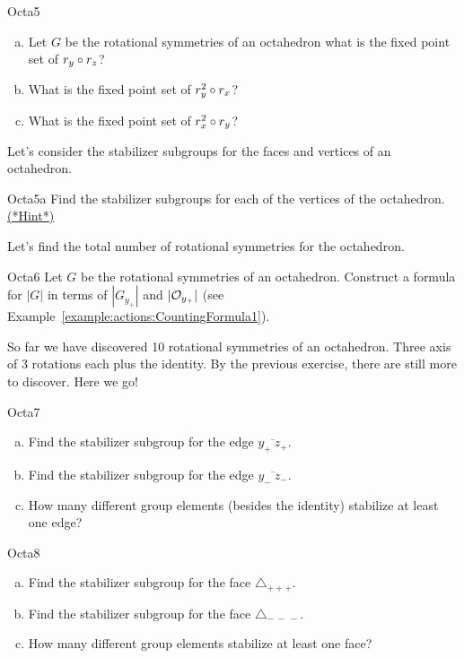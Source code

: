 \begin {exercise}{Octa5}
\begin {enumerate}[(a)]
\item Let $G$ be the rotational symmetries of an octahedron what is the fixed point set of $r_{y}\circ r_{z}$?
\item What is the fixed point set of $r_{y}^2\circ r_{x}$? 
\item What is the fixed point set of $r_{x}^2\circ r_{y}$?
\end{enumerate}
\end {exercise}

Let's consider the stabilizer subgroups for the faces and vertices of an octahedron.  
 
\begin{exercise}{Octa5a}
Find the stabilizer subgroups for each of the vertices of the octahedron. 
\hyperref[sec:actions:hints]{(*Hint*)}
\end{exercise}

Let's find the total number of rotational symmetries for the octahedron. 

\begin{exercise}{Octa6} 
Let $G$ be the rotational symmetries of an octahedron. Construct a formula for $|G|$ in terms of $| G_{y_+}|$ and $|{\cal O}_{y_+}|$ (see Example~\ref{example:actions:CountingFormula1}).
 \end {exercise}

So far we have discovered 10 rotational symmetries of an octahedron.  Three axis of 3 rotations each plus the identity.  By the previous exercise, there are still more to discover.  Here we go! 

\begin {exercise}{Octa7}
\begin {enumerate}[(a)]
\item Find the stabilizer subgroup for the edge $\overline{y_+~z_+}$. 
\item Find the stabilizer subgroup for the edge $\overline{y_-~z_-}$.
\item How many different group elements (besides the identity) stabilize at least one edge?
\end{enumerate}
\end{exercise}	

\begin{exercise}{Octa8}
\begin {enumerate}[(a)]
\item Find the stabilizer subgroup for the face $\triangle_{+ + +}$.
\item Find the stabilizer subgroup for the face $\triangle_{ -~-~-}$.
\item How many different group elements stabilize at least one face?
\end {enumerate}
\end{exercise}

